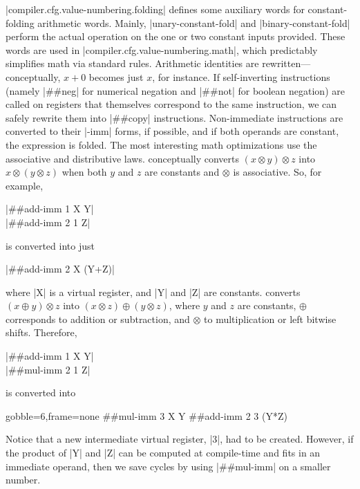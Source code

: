 \factor|compiler.cfg.value-numbering.folding| defines some auxiliary words for
constant-folding arithmetic words.  Mainly, \factor|unary-constant-fold| and
\factor|binary-constant-fold| perform the actual operation on the one or two
constant inputs provided.  These words are used in
\factor|compiler.cfg.value-numbering.math|, which predictably simplifies math
via standard rules.  Arithmetic identities are rewritten---conceptually, $x+0$
becomes just $x$, for instance.  If self-inverting instructions (namely
\factor|##neg| for numerical negation and \factor|##not| for boolean negation)
are called on registers that themselves correspond to the same instruction, we
can safely rewrite them into \factor|##copy| instructions.  Non-immediate
instructions are converted to their \factor|-imm| forms, if possible, and if
both operands are constant, the expression is folded.  The most interesting
math optimizations use the associative and distributive laws.
 conceptually converts $(x \otimes y) \otimes z$ into $x
\otimes (y \otimes z)$ when both $y$ and $z$ are constants and $\otimes$ is
associative.  So, for example,
%
\begin{center}
\factor|##add-imm 1 X Y|\\
\factor|##add-imm 2 1 Z|
\end{center}
%
\noindent is converted into just
%
\begin{center}
\factor|##add-imm 2 X (Y+Z)|
\end{center}
%
\noindent where \factor|X| is a virtual register, and \factor|Y| and \factor|Z|
are constants.   converts $(x \oplus y) \otimes z$ into $(x
\otimes z) \oplus (y \otimes z)$, where $y$ and $z$ are constants, $\oplus$
corresponds to addition or subtraction, and $\otimes$ to multiplication or left
bitwise shifts.  Therefore,
%
\begin{center}
\factor|##add-imm 1 X Y|\\
\factor|##mul-imm 2 1 Z|
\end{center}
%
\noindent is converted into
%
\begin{center}
  \begin{minipage}{0.2\linewidth}
    \begin{factorcode*}{gobble=6,frame=none}
      ##mul-imm 3 X Y
      ##add-imm 2 3 (Y*Z)
    \end{factorcode*}
  \end{minipage}
\end{center}
\noindent Notice that a new intermediate virtual register, \factor|3|, had to
be created.  However, if the product of \factor|Y| and \factor|Z| can be
computed at compile-time and fits in an immediate operand, then we save cycles
by using \factor|##mul-imm| on a smaller number.

